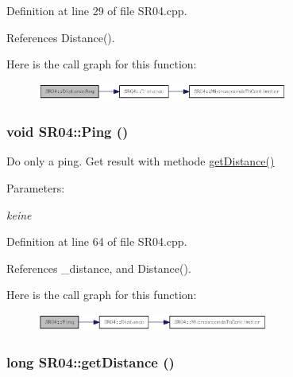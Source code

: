 Definition at line 29 of file SR04.cpp.

References Distance().

Here is the call graph for this function:\nopagebreak
\begin{figure}[H]
\begin{center}
\leavevmode
\includegraphics[width=235pt]{class_s_r04_fd9284a5840d1a09c825f4255dba4b7b_cgraph}
\end{center}
\end{figure}
\hypertarget{class_s_r04_1a76036315b7f13e475988b6ada09ab6}{
\subsubsection[Ping]{\setlength{\rightskip}{0pt plus 5cm}void SR04::Ping ()}}
\label{class_s_r04_1a76036315b7f13e475988b6ada09ab6}


Do only a ping. Get result with methode \hyperlink{class_s_r04_1db22ae175b3fec1619bf858e1b8308e}{getDistance()}

\begin{Desc}
\item[Parameters:]
\begin{description}
\item[{\em keine}]\end{description}
\end{Desc}


Definition at line 64 of file SR04.cpp.

References \_\-distance, and Distance().

Here is the call graph for this function:\nopagebreak
\begin{figure}[H]
\begin{center}
\leavevmode
\includegraphics[width=217pt]{class_s_r04_1a76036315b7f13e475988b6ada09ab6_cgraph}
\end{center}
\end{figure}
\hypertarget{class_s_r04_1db22ae175b3fec1619bf858e1b8308e}{
\subsubsection[getDistance]{\setlength{\rightskip}{0pt plus 5cm}long SR04::getDistance ()}}
\label{class_s_r04_1db22ae175b3fec1619bf858e1b8308e}



